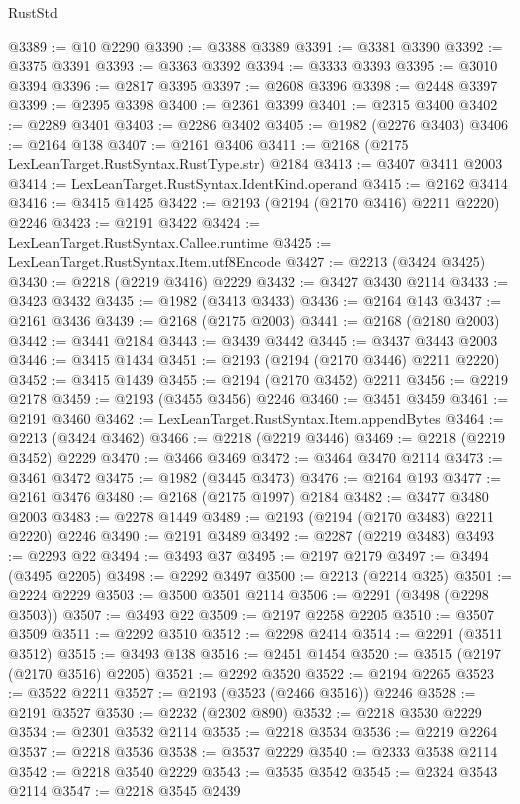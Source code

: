 \begin{lexlean}{RustStd}
\begin{coremodule}
@3389 := @10 @2290
@3390 := @3388 @3389
@3391 := @3381 @3390
@3392 := @3375 @3391
@3393 := @3363 @3392
@3394 := @3333 @3393
@3395 := @3010 @3394
@3396 := @2817 @3395
@3397 := @2608 @3396
@3398 := @2448 @3397
@3399 := @2395 @3398
@3400 := @2361 @3399
@3401 := @2315 @3400
@3402 := @2289 @3401
@3403 := @2286 @3402
@3405 := @1982 (@2276 @3403)
@3406 := @2164 @138
@3407 := @2161 @3406
@3411 := @2168 (@2175 LexLeanTarget.RustSyntax.RustType.str) @2184
@3413 := @3407 @3411 @2003
@3414 := LexLeanTarget.RustSyntax.IdentKind.operand
@3415 := @2162 @3414
@3416 := @3415 @1425
@3422 := @2193 (@2194 (@2170 @3416) @2211 @2220) @2246
@3423 := @2191 @3422
@3424 := LexLeanTarget.RustSyntax.Callee.runtime
@3425 := LexLeanTarget.RustSyntax.Item.utf8Encode
@3427 := @2213 (@3424 @3425)
@3430 := @2218 (@2219 @3416) @2229
@3432 := @3427 @3430 @2114
@3433 := @3423 @3432
@3435 := @1982 (@3413 @3433)
@3436 := @2164 @143
@3437 := @2161 @3436
@3439 := @2168 (@2175 @2003)
@3441 := @2168 (@2180 @2003)
@3442 := @3441 @2184
@3443 := @3439 @3442
@3445 := @3437 @3443 @2003
@3446 := @3415 @1434
@3451 := @2193 (@2194 (@2170 @3446) @2211 @2220)
@3452 := @3415 @1439
@3455 := @2194 (@2170 @3452) @2211
@3456 := @2219 @2178
@3459 := @2193 (@3455 @3456) @2246
@3460 := @3451 @3459
@3461 := @2191 @3460
@3462 := LexLeanTarget.RustSyntax.Item.appendBytes
@3464 := @2213 (@3424 @3462)
@3466 := @2218 (@2219 @3446)
@3469 := @2218 (@2219 @3452) @2229
@3470 := @3466 @3469
@3472 := @3464 @3470 @2114
@3473 := @3461 @3472
@3475 := @1982 (@3445 @3473)
@3476 := @2164 @193
@3477 := @2161 @3476
@3480 := @2168 (@2175 @1997) @2184
@3482 := @3477 @3480 @2003
@3483 := @2278 @1449
@3489 := @2193 (@2194 (@2170 @3483) @2211 @2220) @2246
@3490 := @2191 @3489
@3492 := @2287 (@2219 @3483)
@3493 := @2293 @22
@3494 := @3493 @37
@3495 := @2197 @2179
@3497 := @3494 (@3495 @2205)
@3498 := @2292 @3497
@3500 := @2213 (@2214 @325)
@3501 := @2224 @2229
@3503 := @3500 @3501 @2114
@3506 := @2291 (@3498 (@2298 @3503))
@3507 := @3493 @22
@3509 := @2197 @2258 @2205
@3510 := @3507 @3509
@3511 := @2292 @3510
@3512 := @2298 @2414
@3514 := @2291 (@3511 @3512)
@3515 := @3493 @138
@3516 := @2451 @1454
@3520 := @3515 (@2197 (@2170 @3516) @2205)
@3521 := @2292 @3520
@3522 := @2194 @2265
@3523 := @3522 @2211
@3527 := @2193 (@3523 (@2466 @3516)) @2246
@3528 := @2191 @3527
@3530 := @2232 (@2302 @890)
@3532 := @2218 @3530 @2229
@3534 := @2301 @3532 @2114
@3535 := @2218 @3534
@3536 := @2219 @2264
@3537 := @2218 @3536
@3538 := @3537 @2229
@3540 := @2333 @3538 @2114
@3542 := @2218 @3540 @2229
@3543 := @3535 @3542
@3545 := @2324 @3543 @2114
@3547 := @2218 @3545 @2439

\end{coremodule}
\end{lexlean}
